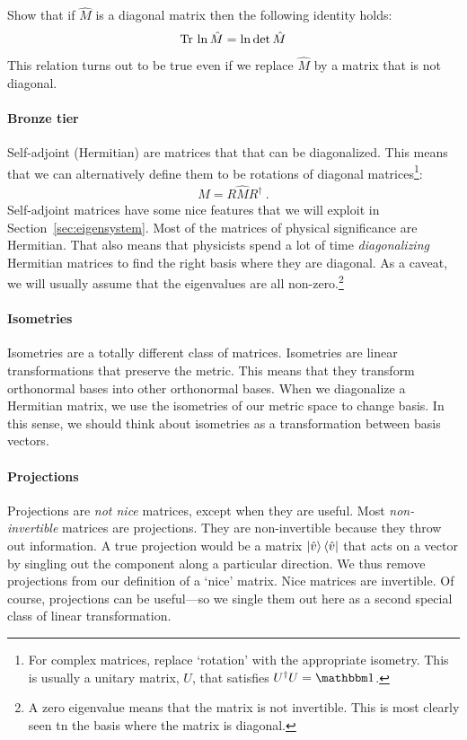 \documentclass[12pt]{article}
\begin{document}
\begin{exercise}
Show that if $\hat M$ is a diagonal matrix then the following identity holds:
\begin{align}
\textnormal{Tr}\, \ln \hat M = \ln \det \hat M
\label{eq:tr:log:M:eq:ln:det:M:diag}
\end{align}
This relation turns out to be true even if we replace $\hat M$ by a matrix that is not diagonal.
\end{exercise}



\paragraph{Bronze tier} Self-adjoint (Hermitian) are matrices that that can be diagonalized. This means that we can alternatively define them to be rotations of diagonal matrices\footnote{For complex matrices, replace `rotation' with the appropriate isometry. This is usually a unitary matrix, $U$, that satisfies $U^\dag U = \one$.}:
\begin{align}
    M = R \hat M R^\dag \ .
\end{align}
Self-adjoint matrices have some nice features that we will exploit in Section~\ref{sec:eigensystem}. Most of the matrices of physical significance are Hermitian. That also means that physicists spend a lot of time \emph{diagonalizing} Hermitian matrices to find the right basis where they are diagonal. As a caveat, we will usually assume that the eigenvalues are all non-zero.\footnote{A zero eigenvalue means that the matrix is not invertible. This is most clearly seen tn the basis where the matrix is diagonal.}


\paragraph{Isometries} Isometries are a totally different class of matrices. Isometries are linear transformations that preserve the metric. This means that they transform orthonormal bases into other orthonormal bases. When we diagonalize a Hermitian matrix, we use the isometries of our metric space to change basis. In this sense, we should think about isometries as a transformation between basis vectors. 

\paragraph{Projections} Projections are \emph{not nice} matrices, except when they are useful. Most \emph{non-invertible} matrices are projections. They are non-invertible because they throw out information. A true projection would be a matrix $\left|\hat{v}\right\rangle\left\langle\hat{v}\right|$ that acts on a vector by singling out the component along a particular direction. We thus remove projections from our definition of a `nice' matrix. Nice matrices are invertible. Of course, projections can be useful---so we single them out here as a second special class of linear transformation.
\end{document}
